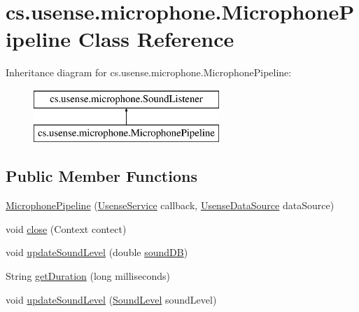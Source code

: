 \hypertarget{classcs_1_1usense_1_1microphone_1_1_microphone_pipeline}{}\section{cs.\+usense.\+microphone.\+Microphone\+Pipeline Class Reference}
\label{classcs_1_1usense_1_1microphone_1_1_microphone_pipeline}
Inheritance diagram for cs.\+usense.\+microphone.\+Microphone\+Pipeline\+:\begin{figure}[H]
\begin{center}
\leavevmode
\includegraphics[height=2.000000cm]{classcs_1_1usense_1_1microphone_1_1_microphone_pipeline}
\end{center}
\end{figure}
\subsection*{Public Member Functions}
\begin{DoxyCompactItemize}
\item 
\hyperlink{classcs_1_1usense_1_1microphone_1_1_microphone_pipeline_ab52960f2388a49d612557af1c7bb1b7e}{Microphone\+Pipeline} (\hyperlink{classcs_1_1usense_1_1_usense_service}{Usense\+Service} callback, \hyperlink{classcs_1_1usense_1_1db_1_1_usense_data_source}{Usense\+Data\+Source} data\+Source)
\item 
void \hyperlink{classcs_1_1usense_1_1microphone_1_1_microphone_pipeline_a537773edd5912aa85f03cab7fe302622}{close} (Context contect)
\item 
void \hyperlink{classcs_1_1usense_1_1microphone_1_1_microphone_pipeline_a576f1ddf3fe13d645e181f2673a9be1e}{update\+Sound\+Level} (double \hyperlink{classcs_1_1usense_1_1microphone_1_1_microphone_pipeline_afa11d6538443e5f38bee7f74af2e12a3}{sound\+D\+B})
\item 
String \hyperlink{classcs_1_1usense_1_1microphone_1_1_microphone_pipeline_a3e2fe1597c9bedc78753616e9c3ec70e}{get\+Duration} (long milliseconds)
\item 
void \hyperlink{classcs_1_1usense_1_1microphone_1_1_microphone_pipeline_ab229a4f2c98a932f685ae36ab4c69adc}{update\+Sound\+Level} (\hyperlink{classcs_1_1usense_1_1microphone_1_1_sound_level}{Sound\+Level} sound\+Level)
\end{DoxyCompactItemize}
